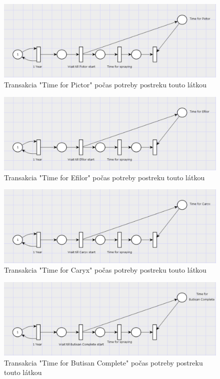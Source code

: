 \documentclass[11pt,a4paper,titlepage]{article}
\begin{document}
\begin{figure}[ht!]
\centering
\includegraphics[scale=0.3]{img/GenPictorTime.png}
\caption{Transakcia "Time for Pictor" počas potreby postreku touto látkou}
\end{figure}

\begin{figure}[ht!]
\centering
\includegraphics[scale=0.3]{img/GenEfilorTime.png}
\caption{Transakcia "Time for Efilor" počas potreby postreku touto látkou}
\end{figure}

\begin{figure}[ht!]
\centering
\includegraphics[scale=0.3]{img/GenCaryxTime.png}
\caption{Transakcia "Time for Caryx" počas potreby postreku touto látkou}
\end{figure}

\begin{figure}[ht!]
\centering
\includegraphics[scale=0.3]{img/GenButisanCompleteTime.png}
\caption{Transakcia "Time for Butisan Complete" počas potreby postreku touto látkou}
\end{figure}
\end{document}
